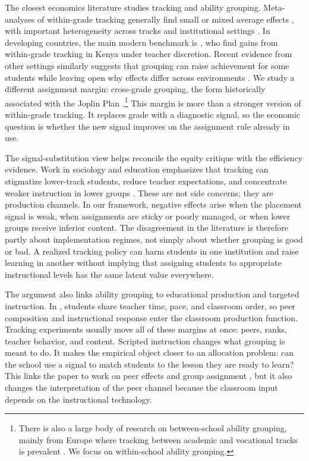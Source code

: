 \documentclass[11pt]{article}
\begin{document}
The closest economics literature studies tracking and ability grouping. Meta-analyses of within-grade tracking generally find small or mixed average effects \citep{slavin1987ability,slavin1990achievement,kulik1987effects,terrin2022effect}, with important heterogeneity across tracks and institutional settings \citep{burke2013classroom,hoxby2005taking,antecol2016peer,garlick,de2022college}. In developing countries, the main modern benchmark is \citet{duflo2011peer}, who find gains from within-grade tracking in Kenya under teacher discretion. Recent evidence from other settings similarly suggests that grouping can raise achievement for some students while leaving open why effects differ across environments \citep{bussofrisancho2023}. We study a different assignment margin: cross-grade grouping, the form historically associated with the Joplin Plan \citep{floyd:1954,slavin1987ability,gutierrezslavin1992}.\footnote{There is also a large body of research on between-school ability grouping, mainly from Europe where tracking between academic and vocational tracks is prevalent \citep{fu2018ability,lavrijsen2015new}. We focus on within-school ability grouping.} This margin is more than a stronger version of within-grade tracking. It replaces grade with a diagnostic signal, so the economic question is whether the new signal improves on the assignment rule already in use.

The signal-substitution view helps reconcile the equity critique with the efficiency evidence. Work in sociology and education emphasizes that tracking can stigmatize lower-track students, reduce teacher expectations, and concentrate weaker instruction in lower groups \citep{oakes1985,gamoran1992,gamorannystrand1994}. These are not side concerns; they are production channels. In our framework, negative effects arise when the placement signal is weak, when assignments are sticky or poorly managed, or when lower groups receive inferior content. The disagreement in the literature is therefore partly about implementation regimes, not simply about whether grouping is good or bad. A realized tracking policy can harm students in one institution and raise learning in another without implying that assigning students to appropriate instructional levels has the same latent value everywhere.

The argument also links ability grouping to educational production and targeted instruction. In \citet{Lazear2001}, students share teacher time, pace, and classroom order, so peer composition and instructional response enter the classroom production function. Tracking experiments usually move all of these margins at once: peers, ranks, teacher behavior, and content. Scripted instruction changes what grouping is meant to do. It makes the empirical object closer to an allocation problem: can the school use a signal to match students to the lesson they are ready to learn? This links the paper to work on peer effects and group assignment \citep{hoxby2005taking,carrellsacerdotewest2013,vigdor2007peer,rjosk2022dispersion}, but it also changes the interpretation of the peer channel because the classroom input depends on the instructional technology.
\end{document}
